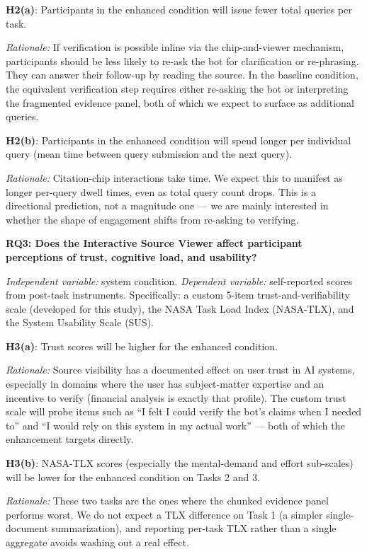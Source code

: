 \textbf{H2(a)}: Participants in the enhanced condition will issue fewer total queries per task.

\textit{Rationale:} If verification is possible inline via the chip-and-viewer mechanism, participants should be less likely to re-ask the bot for clarification or re-phrasing. They can answer their follow-up by reading the source. In the baseline condition, the equivalent verification step requires either re-asking the bot or interpreting the fragmented evidence panel, both of which we expect to surface as additional queries.

\textbf{H2(b)}: Participants in the enhanced condition will spend longer per individual query (mean time between query submission and the next query).

\textit{Rationale:} Citation-chip interactions take time. We expect this to manifest as longer per-query dwell times, even as total query count drops. This is a directional prediction, not a magnitude one --- we are mainly interested in whether the shape of engagement shifts from re-asking to verifying.

\medskip

\textbf{RQ3: Does the Interactive Source Viewer affect participant perceptions of trust, cognitive load, and usability?}

\textit{Independent variable:} system condition. \textit{Dependent variable:} self-reported scores from post-task instruments. Specifically: a custom 5-item trust-and-verifiability scale (developed for this study), the NASA Task Load Index (NASA-TLX), and the System Usability Scale (SUS).

\textbf{H3(a)}: Trust scores will be higher for the enhanced condition.

\textit{Rationale:} Source visibility has a documented effect on user trust in AI systems, especially in domains where the user has subject-matter expertise and an incentive to verify (financial analysis is exactly that profile). The custom trust scale will probe items such as ``I felt I could verify the bot's claims when I needed to'' and ``I would rely on this system in my actual work'' --- both of which the enhancement targets directly.

\textbf{H3(b)}: NASA-TLX scores (especially the mental-demand and effort sub-scales) will be lower for the enhanced condition on Tasks 2 and 3.

\textit{Rationale:} These two tasks are the ones where the chunked evidence panel performs worst. We do not expect a TLX difference on Task 1 (a simpler single-document summarization), and reporting per-task TLX rather than a single aggregate avoids washing out a real effect.

